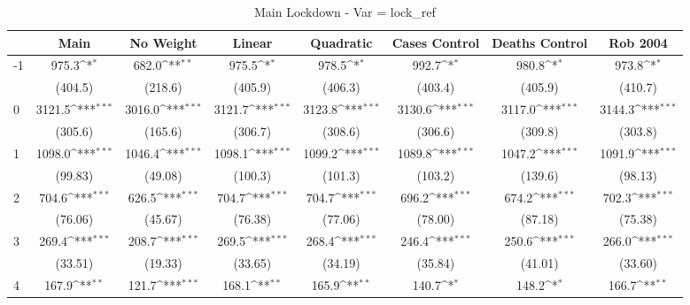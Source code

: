 \documentclass{article}
\begin{document}
{
\def\sym#1{\ifmmode^{#1}\else\(^{#1}\)\fi}
\begin{longtable}{l*{7}{c}}
\caption{Main Lockdown - Var = lock\_ref}\\
\hline\hline\endfirsthead\hline\endhead\hline\endfoot\endlastfoot
                &\multicolumn{1}{c}{Main}&\multicolumn{1}{c}{No Weight}&\multicolumn{1}{c}{Linear}&\multicolumn{1}{c}{Quadratic}&\multicolumn{1}{c}{Cases Control}&\multicolumn{1}{c}{Deaths Control}&\multicolumn{1}{c}{Rob 2004}\\
\hline
-1              &    975.3\sym{*}  &    682.0\sym{**} &    975.5\sym{*}  &    978.5\sym{*}  &    992.7\sym{*}  &    980.8\sym{*}  &    973.8\sym{*}  \\
                &  (404.5)         &  (218.6)         &  (405.9)         &  (406.3)         &  (403.4)         &  (405.9)         &  (410.7)         \\
0               &   3121.5\sym{***}&   3016.0\sym{***}&   3121.7\sym{***}&   3123.8\sym{***}&   3130.6\sym{***}&   3117.0\sym{***}&   3144.3\sym{***}\\
                &  (305.6)         &  (165.6)         &  (306.7)         &  (308.6)         &  (306.6)         &  (309.8)         &  (303.8)         \\
1               &   1098.0\sym{***}&   1046.4\sym{***}&   1098.1\sym{***}&   1099.2\sym{***}&   1089.8\sym{***}&   1047.2\sym{***}&   1091.9\sym{***}\\
                &  (99.83)         &  (49.08)         &  (100.3)         &  (101.3)         &  (103.2)         &  (139.6)         &  (98.13)         \\
2               &    704.6\sym{***}&    626.5\sym{***}&    704.7\sym{***}&    704.7\sym{***}&    696.2\sym{***}&    674.2\sym{***}&    702.3\sym{***}\\
                &  (76.06)         &  (45.67)         &  (76.38)         &  (77.06)         &  (78.00)         &  (87.18)         &  (75.38)         \\
3               &    269.4\sym{***}&    208.7\sym{***}&    269.5\sym{***}&    268.4\sym{***}&    246.4\sym{***}&    250.6\sym{***}&    266.0\sym{***}\\
                &  (33.51)         &  (19.33)         &  (33.65)         &  (34.19)         &  (35.84)         &  (41.01)         &  (33.60)         \\
4               &    167.9\sym{**} &    121.7\sym{***}&    168.1\sym{**} &    165.9\sym{**} &    140.7\sym{*}  &    148.2\sym{*}  &    166.7\sym{**} \\

\end{longtable}}
\end{document}
